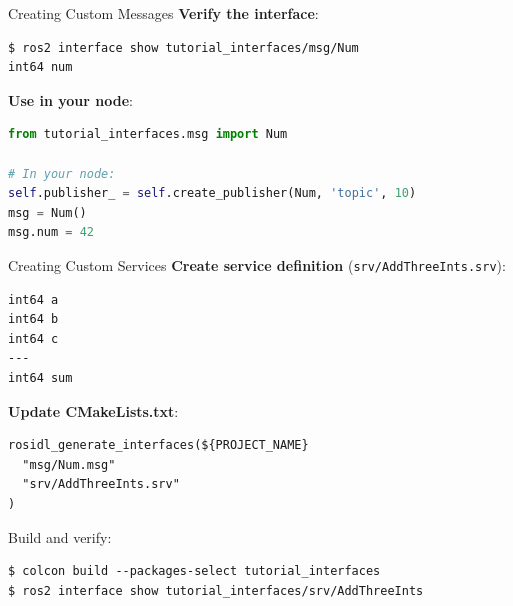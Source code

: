 \begin{frame}{Creating Custom Messages}
    \textbf{Verify the interface}:
    \begin{lstlisting}[language=shell]
$ ros2 interface show tutorial_interfaces/msg/Num
int64 num
\end{lstlisting}

    \textbf{Use in your node}:
    \begin{lstlisting}[language=python]
from tutorial_interfaces.msg import Num

# In your node:
self.publisher_ = self.create_publisher(Num, 'topic', 10)
msg = Num()
msg.num = 42
\end{lstlisting}
\end{frame}

\begin{frame}{Creating Custom Services}
    \textbf{Create service definition} (\texttt{srv/AddThreeInts.srv}):
    \begin{lstlisting}[language=syntax]
int64 a
int64 b
int64 c
---
int64 sum
\end{lstlisting}

    \textbf{Update CMakeLists.txt}:
    \begin{lstlisting}[language=syntax]
rosidl_generate_interfaces(${PROJECT_NAME}
  "msg/Num.msg"
  "srv/AddThreeInts.srv"
)
\end{lstlisting}

    Build and verify:
    \begin{lstlisting}[language=shell]
$ colcon build --packages-select tutorial_interfaces
$ ros2 interface show tutorial_interfaces/srv/AddThreeInts
\end{lstlisting}
\end{frame}


